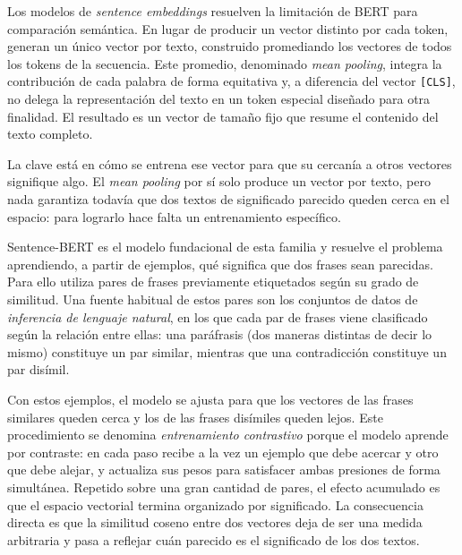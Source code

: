 Los modelos de \textit{sentence embeddings} resuelven la limitación de BERT para comparación semántica. En lugar de producir un vector distinto por cada token, generan un único vector por texto, construido promediando los vectores de todos los tokens de la secuencia. Este promedio, denominado \textit{mean pooling}, integra la contribución de cada palabra de forma equitativa y, a diferencia del vector \texttt{[CLS]}, no delega la representación del texto en un token especial diseñado para otra finalidad. El resultado es un vector de tamaño fijo que resume el contenido del texto completo.

La clave está en cómo se entrena ese vector para que su cercanía a otros vectores signifique algo. El \textit{mean pooling} por sí solo produce un vector por texto, pero nada garantiza todavía que dos textos de significado parecido queden cerca en el espacio: para lograrlo hace falta un entrenamiento específico.

Sentence-BERT \parencite{reimers_2019_sentencebert} es el modelo fundacional de esta familia y resuelve el problema aprendiendo, a partir de ejemplos, qué significa que dos frases sean parecidas. Para ello utiliza pares de frases previamente etiquetados según su grado de similitud. Una fuente habitual de estos pares son los conjuntos de datos de \textit{inferencia de lenguaje natural}, en los que cada par de frases viene clasificado según la relación entre ellas: una paráfrasis (dos maneras distintas de decir lo mismo) constituye un par similar, mientras que una contradicción constituye un par disímil.

Con estos ejemplos, el modelo se ajusta para que los vectores de las frases similares queden cerca y los de las frases disímiles queden lejos. Este procedimiento se denomina \textit{entrenamiento contrastivo} porque el modelo aprende por contraste: en cada paso recibe a la vez un ejemplo que debe acercar y otro que debe alejar, y actualiza sus pesos para satisfacer ambas presiones de forma simultánea. Repetido sobre una gran cantidad de pares, el efecto acumulado es que el espacio vectorial termina organizado por significado. La consecuencia directa es que la similitud coseno entre dos vectores deja de ser una medida arbitraria y pasa a reflejar cuán parecido es el significado de los dos textos.

